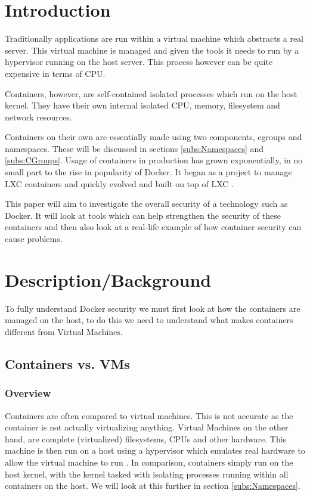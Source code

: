 \documentclass{article}
\author{Stephen Coady}
\begin{document}

\thispagestyle{empty}

\newpage
\tableofcontents
\newpage

\newpage
\section{Introduction}
\label{sec:Introduction} %
Traditionally applications are run within a virtual machine which abstracts a real server. This virtual machine is managed and given the tools it needs to run by a hypervisor running on the host server. This process however can be quite expensive in terms of CPU.

Containers, however, are self-contained isolated processes which run on the host kernel. They have their own internal isolated CPU, memory, filesystem and network resources. 

Containers on their own are essentially made using two components, cgroups and namespaces. These will be discussed in sections \ref{subs:Namespaces} and \ref{subs:CGroups}. Usage of containers in production has grown exponentially, in no small part to the rise in popularity of Docker. It began as a project to manage LXC containers and quickly evolved and built on top of LXC \citep{BCN}.

This paper will aim to investigate the overall security of a technology such as Docker. It will look at tools which can help strengthen the security of these containers and then also look at a real-life example of how container security can cause problems.

\newpage
\section{Description/Background}
\label{sec:Description/Background}
To fully understand Docker security we must first look at how the containers are managed on the host, to do this we need to understand what makes containers different from Virtual Machines.

\subsection{Containers vs. VMs}
\label{subs:VMs}
\subsubsection{Overview}
Containers are often compared to virtual machines. This is not accurate as the container is not actually virtualizing anything. Virtual Machines on the other hand, are complete (virtualized) filesystems, CPUs and other hardware. This machine is then run on a host using a hypervisor which emulates real hardware to allow the virtual machine to run \citep{Hertz2016}. In comparison, containers simply run on the host kernel, with the kernel tasked with isolating processes running within all containers on the host. We will look at this further in section \ref{subs:Namespaces}.
\end{document}
